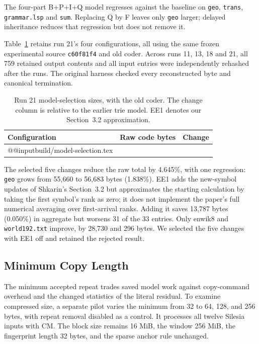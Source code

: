 \documentclass[10pt,letterpaper]{article}
\newcommand{\code}[1]{\texttt{#1}}
\begin{document}
The four-part B+P+I+Q model regresses against the baseline on \code{geo}, \code{trans}, \code{grammar.lsp} and \code{sum}. Replacing Q by F leaves only \code{geo} larger; delayed inheritance reduces that regression but does not remove it.

Table~\ref{tab:selection} retains run 21's four configurations, all using the same frozen experimental source \code{c60f81f4} and old coder. Across runs 11, 13, 18 and 21, all 759 retained output contents and all input entries were independently rehashed after the runs. The original harness checked every reconstructed byte and canonical termination.

\begin{table}[htbp]
\centering
\caption{Run 21 model-selection sizes, with the old coder. The change column is relative to the earlier trie model. EE1 denotes our Section~3.2 approximation.}\label{tab:selection}
\medskip
\begin{tabular}{@{}lrr@{}}
\toprule
Configuration & Raw code bytes & Change\\
\midrule
\csname @@input\endcsname build/model-selection.tex
\bottomrule
\end{tabular}
\end{table}

The selected five changes reduce the raw total by 4.645\%, with one regression: \code{geo} grows from 55,660 to 56,683 bytes (1.838\%). EE1 adds the new-symbol updates of Shkarin's Section~3.2 but approximates the starting calculation by taking the first symbol's rank as zero; it does not implement the paper's full numerical averaging over first-arrival ranks. Adding it saves 13,787 bytes (0.050\%) in aggregate but worsens 31 of the 33 entries. Only enwik8 and \code{world192.txt} improve, by 28,730 and 296 bytes. We selected the five changes with EE1 off and retained the rejected result.

\subsection{Minimum Copy Length}
The minimum accepted repeat trades saved model work against copy-command overhead and the changed statistics of the literal residual. To examine compressed size, a separate pilot varies the minimum from 32 to 64, 128, and 256 bytes, with repeat removal disabled as a control. It processes all twelve Silesia inputs with CM. The block size remains 16 MiB, the window 256 MiB, the fingerprint length 32 bytes, and the sparse anchor rule unchanged.
\end{document}
